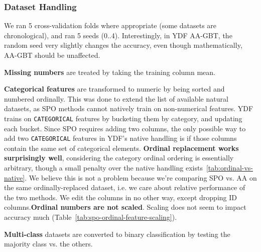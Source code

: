 \documentclass[sigconf,screen]{acmart}
\begin{document}
\subsubsection{Dataset Handling}

We ran 5 cross-validation folds where appropriate (some datasets are chronological), and ran 5 seeds (0..4). Interestingly, in YDF AA-GBT, the random seed very slightly changes the accuracy, even though mathematically, AA-GBT should be unaffected. %

\textbf{Missing numbers} are treated by taking the training column mean.


\textbf{Categorical features} are transformed to numeric by being sorted and numbered ordinally. This was done to extend the list of available natural datasets, as SPO methods cannot natively train on non-numerical features. YDF trains on \texttt{CATEGORICAL} features by bucketing them by category, and updating each bucket. Since SPO requires adding two columns, the only possible way to add two \texttt{CATEGORICAL} features in YDF's native handling is if those columns contain the same set of categorical elements. \textbf{Ordinal replacement works surprisingly well}, considering the category ordinal ordering is essentially arbitrary, though a small penalty over the native handling exists~\ref{tab:ordinal-vs-native}. We believe this is not a problem because we're comparing SPO vs. AA on the same ordinally-replaced dataset, i.e. we care about relative performance of the two methods. We edit the columns in no other way, except dropping ID columns.\textbf{Ordinal numbers are not scaled}. Scaling does not seem to impact accuracy much (Table~\ref{tab:spo-ordinal-feature-scaling}). %

\textbf{Multi-class} datasets are converted to binary classification by testing the majority class vs. the others.
\end{document}
